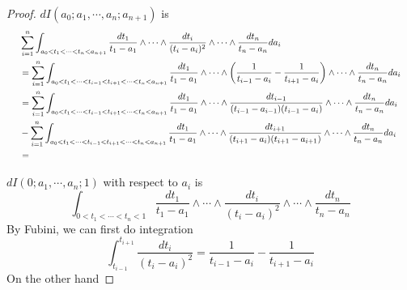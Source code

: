\documentclass[main]{subfiles}
\begin{document}
\begin{proof}
$dI(a_0;a_1,\cdots,a_n;a_{n+1})$ is
\begin{equation*}
\scalemath{0.8}{
\begin{split}
&\sum_{i=1}^n\int_{a_0<t_1<\cdots<t_n<a_{n+1}}\frac{dt_1}{t_1-a_1}\wedge\cdots\wedge\frac{dt_i}{(t_i-a_i)^2}\wedge\cdots\wedge\frac{dt_n}{t_n-a_n}da_i\\
&=\sum_{i=1}^{n}\int_{a_0<t_1<\cdots<t_{i-1}<t_{i+1}<\cdots<t_n<a_{n+1}}\frac{dt_1}{t_1-a_1}\wedge\cdots\wedge\left(\frac{1}{t_{i-1}-a_{i}}-\frac{1}{t_{i+1}-a_{i}}\right)\wedge\cdots\wedge\frac{dt_n}{t_n-a_n}da_i\\
&=\sum_{i=1}^n\int_{a_0<t_1<\cdots<t_{i-1}<t_{i+1}<\cdots<t_n<a_{n+1}}\frac{dt_1}{t_1-a_1}\wedge\cdots\wedge\frac{dt_{i-1}}{(t_{i-1}-a_{i-1})(t_{i-1}-a_{i})}\wedge\cdots\wedge\frac{dt_n}{t_n-a_n}da_i \\
&-\sum_{i=1}^n\int_{a_0<t_1<\cdots<t_{i-1}<t_{i+1}<\cdots<t_n<a_{n+1}}\frac{dt_1}{t_1-a_1}\wedge\cdots\wedge\frac{dt_{i+1}}{(t_{i+1}-a_{i})(t_{i+1}-a_{i+1})}\wedge\cdots\wedge\frac{dt_n}{t_n-a_n}da_i\\
&=
\end{split}
}
\end{equation*}

$dI(0;a_1,\cdots,a_n;1)$ with respect to $a_i$ is \[\int_{0<t_1<\cdots<t_n<1}\frac{dt_1}{t_1-a_1}\wedge\cdots\wedge\frac{dt_i}{(t_i-a_i)^2}\wedge\cdots\wedge\frac{dt_n}{t_n-a_n}\]
By Fubini, we can first do integration
\[\int_{t_{i-1}}^{t_{i+1}}\frac{dt_i}{(t_i-a_i)^2}=\frac{1}{t_{i-1}-a_{i}}-\frac{1}{t_{i+1}-a_{i}}\]
On the other hand
\end{proof}
\end{document}
